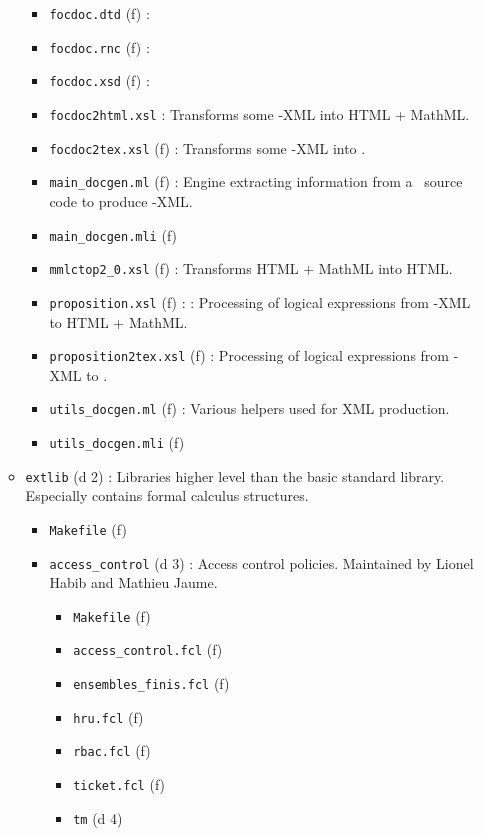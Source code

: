 \begin{itemize}
\begin{itemize}
\begin{itemize}
    \item {\tt focdoc.dtd} (f) :
    \item {\tt focdoc.rnc} (f) :
    \item {\tt focdoc.xsd} (f) :
    \item {\tt focdoc2html.xsl} : Transforms some \focalizedoc-XML into
        HTML + MathML.
    \item {\tt focdoc2tex.xsl} (f) : Transforms some \focalizedoc-XML
        into \latex.
    \item {\tt main\_docgen.ml} (f) : Engine extracting information from
        a \focalize\ source code to produce \focalizedoc-XML.
    \item {\tt main\_docgen.mli} (f)
    \item {\tt mmlctop2\_0.xsl} (f) : Transforms HTML + MathML into
      HTML.
    \item {\tt proposition.xsl} (f) : : Processing of logical
      expressions from \focalizedoc-XML to HTML + MathML.
    \item {\tt proposition2tex.xsl} (f) : Processing of logical
      expressions from \focalizedoc-XML to \latex.
    \item {\tt utils\_docgen.ml} (f) : Various helpers used for XML
      production.
    \item {\tt utils\_docgen.mli} (f)
    \end{itemize}
  \item {\tt extlib} (d 2) : 
    Libraries higher level than the basic
    standard library. Especially contains formal calculus structures.
    \begin{itemize}
    \item {\tt Makefile} (f)
    \item {\tt access\_control} (d 3) : Access control
      policies. Maintained by Lionel Habib and Mathieu Jaume.
      \begin{itemize}
      \item {\tt Makefile} (f)
      \item {\tt access\_control.fcl} (f)
      \item {\tt ensembles\_finis.fcl} (f)
      \item {\tt hru.fcl} (f)
      \item {\tt rbac.fcl} (f)
      \item {\tt ticket.fcl} (f)
      \item {\tt tm} (d 4)

\end{itemize}
\end{itemize}
\end{itemize}
\end{itemize}
